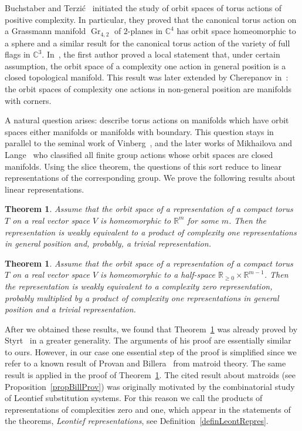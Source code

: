 \documentclass[english,12pt,oneside]{amsproc}
\DeclareMathOperator{\Gr}{Gr}
\newcommand{\Ro}{\mathbb{R}}
\newcommand{\Rg}{\mathbb{R}_{\geqslant 0}}
\newcommand{\Co}{\mathbb{C}}
\newcounter{stmcounter}[section]
\numberwithin{equation}{section}
\theoremstyle{plain}
\newtheorem{thm}[stmcounter]{Theorem}
\theoremstyle{definition}
\theoremstyle{remark}
\begin{document}
Buchstaber and Terzi\'{c}~\cite{BT} initiated the study of orbit spaces of torus actions of positive complexity. In particular, they proved that the canonical torus action on a Grassmann manifold $\Gr_{4,2}$ of $2$-planes in $\Co^4$ has orbit space homeomorphic to a sphere and a similar result for the canonical torus action of the variety of full flags in $\Co^3$. In~\cite{AyzCompl}, the first author proved a local statement that, under certain assumption, the orbit space of a complexity one action in general position is a closed topological manifold. This result was later extended by Cherepanov in~\cite{Cher}: the orbit spaces of complexity one actions in non-general position are manifolds with corners.

A natural question arises: describe torus actions on manifolds which have orbit spaces either manifolds or manifolds with boundary. This question stays in parallel to the seminal work of Vinberg~\cite{Vin}, and the later works of Mikhailova and Lange~\cite{Mikh,Lange16,Lange,LangMikh} who classified all finite group actions whose orbit spaces are closed manifolds. Using the slice theorem, the questions of this sort reduce to linear representations of the corresponding group. We prove the following results about linear representations.

\begin{thm}\label{thmIntroOpen}
Assume that the orbit space of a representation of a compact torus $T$ on a real vector space $V$ is homeomorphic to $\Ro^m$ for some $m$. Then the representation is weakly equivalent to a product of complexity one representations in general position and, probably, a trivial representation.
\end{thm}

\begin{thm}\label{thmIntroBoundary}
Assume that the orbit space of a representation of a compact torus $T$ on a real vector space $V$ is homeomorphic to a half-space $\Rg\times\Ro^{m-1}$. Then the representation is weakly equivalent to a complexity zero representation, probably multiplied by a product of complexity one representations in general position and a trivial representation.
\end{thm}

After we obtained these results, we found that Theorem~\ref{thmIntroOpen} was already proved by Styrt~\cite{Styrt} in a greater generality. The arguments of his proof are essentially similar to ours. However, in our case one essential step of the proof is simplified since we refer to a known result of Provan and Billera~\cite{BilProv} from matroid theory. The same result is applied in the proof of Theorem~\ref{thmIntroBoundary}. The cited result about matroids (see Proposition~\ref{propBillProv}) was originally motivated by the combinatorial study of Leontief substitution systems. For this reason we call the products of representations of complexities zero and one, which appear in the statements of the theorems, \emph{Leontief representations}, see Definition~\ref{definLeontRepres}.
\end{document}
